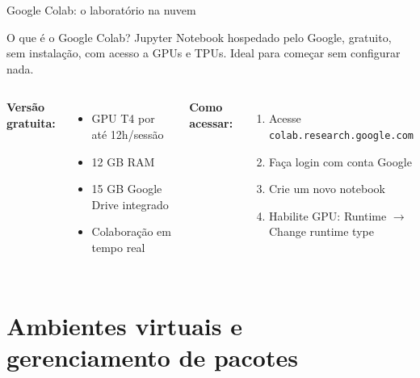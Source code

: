 \begin{frame}[shrink=15]{Google Colab: o laboratório na nuvem}
\begin{block}{O que é o Google Colab?}
Jupyter Notebook hospedado pelo Google, gratuito, sem instalação, com acesso a GPUs e TPUs. Ideal para começar sem configurar nada.
\end{block}

\vspace{0.3cm}

\begin{columns}
\textbf{Versão gratuita:}
\begin{itemize}
    \item GPU T4 por até 12h/sessão
    \item 12 GB RAM
    \item 15 GB Google Drive integrado
    \item Colaboração em tempo real
\end{itemize}

\textbf{Como acessar:}
\begin{enumerate}
    \item Acesse \texttt{colab.research.google.com}
    \item Faça login com conta Google
    \item Crie um novo notebook
    \item Habilite GPU: Runtime $\to$ Change runtime type
\end{enumerate}
\end{columns}

\vspace{0.2cm}
\end{frame}

\section{Ambientes virtuais e gerenciamento de pacotes}

